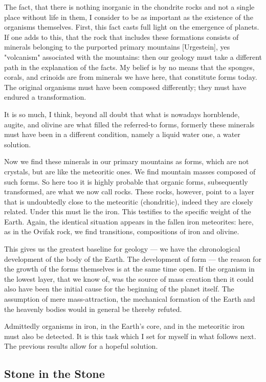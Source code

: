 \documentclass[a4paper, 11pt, oneside]{article}
\begin{document}
The fact, that there is nothing inorganic in the chondrite rocks and not a single place without life in them, I consider to be as important as the existence of the organisms themselves. First, this fact casts full light on the emergence of planets. If one adds to this, that the rock that includes these formations consists of minerals belonging to the purported primary mountains [Urgestein], yes "volcanism" associated with the mountains: then our geology must take a different path in the explanation of the facts. My belief is by no means that the sponges, corals, and crinoids are from minerals we have here, that constitute forms today. The original organisms must have been composed differently; they must have endured a transformation.

It is so much, I think, beyond all doubt that what is nowadays hornblende, augite, and olivine are what filled the referred-to forms, formerly these minerals must have been in a different condition, namely a liquid water one, a water solution.

Now we find these minerals in our primary mountains as forms, which are not crystals, but are like the meteoritic ones. We find mountain masses composed of such forms. So here too it is highly probable that organic forms, subsequently transformed, are what we now call rocks. These rocks, however, point to a layer that is undoubtedly close to the meteoritic (chondritic), indeed they are closely related. Under this must lie the iron. This testifies to the specific weight of the Earth. Again, the identical situation appears in the fallen iron meteorites: here, as in the Ovifak rock, we find transitions, compositions of iron and olivine.

This gives us the greatest baseline for geology — we have the chronological development of the body of the Earth. The development of form — the reason for the growth of the forms themselves is at the same time open. If the organism in the lowest layer, that we know of, was the source of mass creation then it could also have been the initial cause for the beginning of the planet itself. The assumption of mere mass-attraction, the mechanical formation of the Earth and the heavenly bodies would in general be thereby refuted.

Admittedly organisms in iron, in the Earth's core, and in the meteoritic iron must also be detected. It is this task which I set for myself in what follows next. The previous results allow for a hopeful solution.
\clearpage
\subsection{Stone in the Stone}
\end{document}
